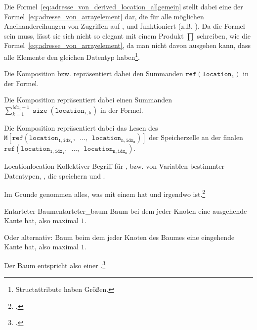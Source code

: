 \begin{Special_Paragraph}
  Die Formel~\ref{eq:adresse_von_derived_location_allgemein} stellt dabei eine  der Formel~\ref{eq:adresse_von_arrayelement} dar, die für alle möglichen Aneinandereihungen von Zugriffen auf ,  und  funktioniert (z.B. ). Da die Formel  sein muss, lässt sie sich nicht so elegant mit einem Produkt $\prod$ schreiben, wie die Formel~\ref{eq:adresse_von_arrayelement}, da man nicht davon ausgehen kann, dass alle Elemente den gleichen Datentyp haben\footnote{Structattribute haben  Größen.}.

  Die Komposition  bzw.  repräsentiert dabei den Summanden $\mathtt{ref(location_1)}$ in der Formel.

  Die Komposition  repräsentiert dabei einen Summanden $\sum_{k=1}^{idx_i - 1} \mathtt{\operatorname{size}(location_{i, k})}$ in der Formel.

Die Komposition  repräsentiert dabei das Lesen des  $\mathtt{M\left[ref(location_{1, idx_1},\enspace\ldots,\enspace location_{n, idx_n})\right]}$ der Speicherzelle an der finalen  $\mathtt{ref(location_{1, idx_1},\enspace\ldots,\enspace location_{n, idx_n})}$.
\end{Special_Paragraph}

\begin{Definition}{Location}{location}
  Kollektiver Begriff für ,  bzw.  von Variablen bestimmter Datentypen, , die  speichern und .

  Im Grunde genommen alles, was mit einem  hat und irgendwo  ist.\footcite{g_siek_course_2022}
\end{Definition}

\begin{Definition}{Entarteter Baum}{entarteter_baum}
  Baum bei dem jeder Knoten  eine ausgehende Kante hat, also maximal  $1$.

  \textnormal{Oder alternativ:} Baum beim dem jeder Knoten des Baumes  eine eingehende Kante hat, also maximal  $1$.

  Der Baum entspricht also einer .\footcite{noauthor_baume_nodate}
\end{Definition}


